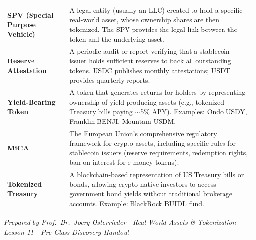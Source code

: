 \documentclass[11pt,a4paper]{article}
\begin{document}
\begin{tabular}{@{}p{3.6cm}p{11.0cm}@{}}
\textbf{SPV (Special Purpose Vehicle)} & A legal entity (usually an LLC) created to hold a specific real-world asset, whose ownership shares are then tokenized. The SPV provides the legal link between the token and the underlying asset. \\
\textbf{Reserve Attestation}       & A periodic audit or report verifying that a stablecoin issuer holds sufficient reserves to back all outstanding tokens. USDC publishes monthly attestations; USDT provides quarterly reports. \\
\textbf{Yield-Bearing Token}       & A token that generates returns for holders by representing ownership of yield-producing assets (e.g., tokenized Treasury bills paying $\sim$5\% APY). Examples: Ondo USDY, Franklin BENJI, Mountain USDM. \\
\textbf{MiCA}                      & The European Union's comprehensive regulatory framework for crypto-assets, including specific rules for stablecoin issuers (reserve requirements, redemption rights, ban on interest for e-money tokens). \\
\textbf{Tokenized Treasury}        & A blockchain-based representation of US Treasury bills or bonds, allowing crypto-native investors to access government bond yields without traditional brokerage accounts. Example: BlackRock BUIDL fund. \\
\bottomrule
\end{tabular}

\vspace{6pt}
\noindent\textcolor{mlgray}{\small\textit{Prepared by Prof.\ Dr.\ Joerg Osterrieder \,\textbullet\, Real-World Assets \& Tokenization --- Lesson 11 \,\textbullet\, Pre-Class Discovery Handout}}
\end{document}
